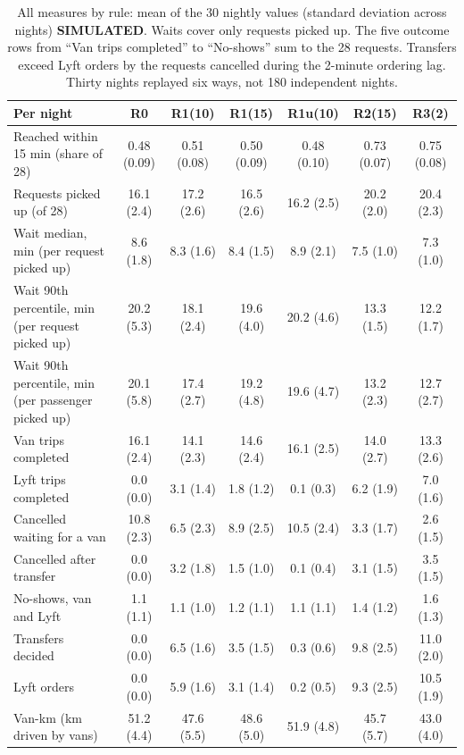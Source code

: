 \documentclass{article}
\newcommand{\lab}[1]{{\footnotesize\textsf{\textbf{#1}}}}
\newcommand{\SIM}{\lab{SIMULATED}}
\begin{document}
\begin{table}[t]
\centering\small
\caption{All measures by rule: mean of the 30 nightly values (standard deviation across nights) \SIM. Waits cover only requests picked up. The five outcome rows from ``Van trips completed'' to ``No-shows'' sum to the 28 requests. Transfers exceed Lyft orders by the requests cancelled during the 2-minute ordering lag. Thirty nights replayed six ways, not 180 independent nights.}\label{tab:metrics}
\begin{tabularx}{\textwidth}{@{}Lcccccc@{}}
\toprule
\textbf{Per night} & \textbf{R0} & \textbf{R1(10)} & \textbf{R1(15)} & \textbf{R1u(10)} & \textbf{R2(15)} & \textbf{R3(2)}\\
\midrule
Reached within 15 min (share of 28) & 0.48 (0.09) & 0.51 (0.08) & 0.50 (0.09) & 0.48 (0.10) & 0.73 (0.07) & 0.75 (0.08)\\
Requests picked up (of 28) & 16.1 (2.4) & 17.2 (2.6) & 16.5 (2.6) & 16.2 (2.5) & 20.2 (2.0) & 20.4 (2.3)\\
Wait median, min (per request picked up) & 8.6 (1.8) & 8.3 (1.6) & 8.4 (1.5) & 8.9 (2.1) & 7.5 (1.0) & 7.3 (1.0)\\
Wait 90th percentile, min (per request picked up) & 20.2 (5.3) & 18.1 (2.4) & 19.6 (4.0) & 20.2 (4.6) & 13.3 (1.5) & 12.2 (1.7)\\
Wait 90th percentile, min (per passenger picked up) & 20.1 (5.8) & 17.4 (2.7) & 19.2 (4.8) & 19.6 (4.7) & 13.2 (2.3) & 12.7 (2.7)\\
Van trips completed & 16.1 (2.4) & 14.1 (2.3) & 14.6 (2.4) & 16.1 (2.5) & 14.0 (2.7) & 13.3 (2.6)\\
Lyft trips completed & 0.0 (0.0) & 3.1 (1.4) & 1.8 (1.2) & 0.1 (0.3) & 6.2 (1.9) & 7.0 (1.6)\\
Cancelled waiting for a van & 10.8 (2.3) & 6.5 (2.3) & 8.9 (2.5) & 10.5 (2.4) & 3.3 (1.7) & 2.6 (1.5)\\
Cancelled after transfer & 0.0 (0.0) & 3.2 (1.8) & 1.5 (1.0) & 0.1 (0.4) & 3.1 (1.5) & 3.5 (1.5)\\
No-shows, van and Lyft & 1.1 (1.1) & 1.1 (1.0) & 1.2 (1.1) & 1.1 (1.1) & 1.4 (1.2) & 1.6 (1.3)\\
\midrule
Transfers decided & 0.0 (0.0) & 6.5 (1.6) & 3.5 (1.5) & 0.3 (0.6) & 9.8 (2.5) & 11.0 (2.0)\\
Lyft orders & 0.0 (0.0) & 5.9 (1.6) & 3.1 (1.4) & 0.2 (0.5) & 9.3 (2.5) & 10.5 (1.9)\\
Van-km (km driven by vans) & 51.2 (4.4) & 47.6 (5.5) & 48.6 (5.0) & 51.9 (4.8) & 45.7 (5.7) & 43.0 (4.0)\\
\bottomrule
\end{tabularx}
\end{table}
\end{document}
